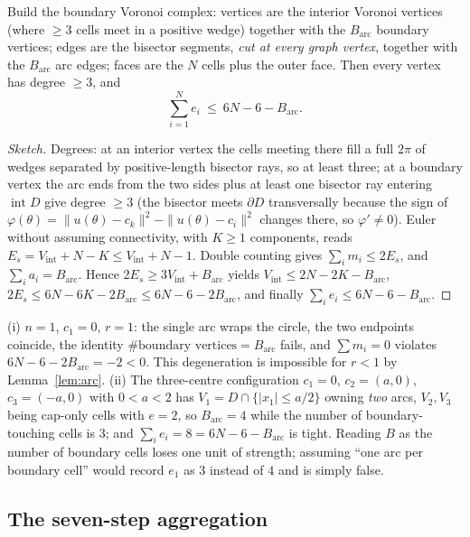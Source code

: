 \begin{lemma}\label{lem:D}
Build the boundary Voronoi complex: vertices are the interior Voronoi vertices (where $\ge3$ cells
meet in a positive wedge) together with the $B_{\mathrm{arc}}$ boundary vertices; edges are the
bisector segments, \emph{cut at every graph vertex}, together with the $B_{\mathrm{arc}}$ arc edges;
faces are the $N$ cells plus the outer face. Then every vertex has degree $\ge3$, and
\[
\sum_{i=1}^{N}e_i\ \le\ 6N-6-B_{\mathrm{arc}} .
\]
\end{lemma}
\begin{proof}[Sketch]
Degrees: at an interior vertex the cells meeting there fill a full $2\pi$ of wedges separated by
positive-length bisector rays, so at least three; at a boundary vertex the arc ends from the two
sides plus at least one bisector ray entering $\operatorname{int}D$ give degree $\ge3$ (the
bisector meets $\partial D$ transversally because the sign of
$\varphi(\theta)=\|u(\theta)-c_k\|^2-\|u(\theta)-c_i\|^2$ changes there, so $\varphi'\ne0$).
Euler without assuming connectivity, with $K\ge1$ components, reads
$E_s=V_{\mathrm{int}}+N-K\le V_{\mathrm{int}}+N-1$. Double counting gives
$\sum_im_i\le2E_s$, and $\sum_ia_i=B_{\mathrm{arc}}$. Hence
$2E_s\ge3V_{\mathrm{int}}+B_{\mathrm{arc}}$ yields $V_{\mathrm{int}}\le2N-2K-B_{\mathrm{arc}}$,
$2E_s\le6N-6K-2B_{\mathrm{arc}}\le6N-6-2B_{\mathrm{arc}}$, and finally
$\sum_ie_i\le6N-6-B_{\mathrm{arc}}$.
\end{proof}

\begin{remark}
(i) $n=1$, $c_1=0$, $r=1$: the single arc wraps the circle, the two endpoints coincide, the
identity $\#\text{boundary vertices}=B_{\mathrm{arc}}$ fails, and $\sum m_i=0$ violates
$6N-6-2B_{\mathrm{arc}}=-2<0$. This degeneration is impossible for $r<1$ by Lemma~\ref{lem:arc}.
(ii) The three-centre configuration $c_1=0$, $c_2=(a,0)$, $c_3=(-a,0)$ with $0<a<2$ has
$V_1=D\cap\{|x_1|\le a/2\}$ owning \emph{two} arcs, $V_2,V_3$ being cap-only cells with $e=2$, so
$B_{\mathrm{arc}}=4$ while the number of boundary-touching cells is $3$; and
$\sum_ie_i=8=6N-6-B_{\mathrm{arc}}$ is tight. Reading $B$ as the number of boundary cells loses one
unit of strength; assuming ``one arc per boundary cell'' would record $e_1$ as $3$ instead of $4$
and is simply false.
\end{remark}

\subsection{The seven-step aggregation}

